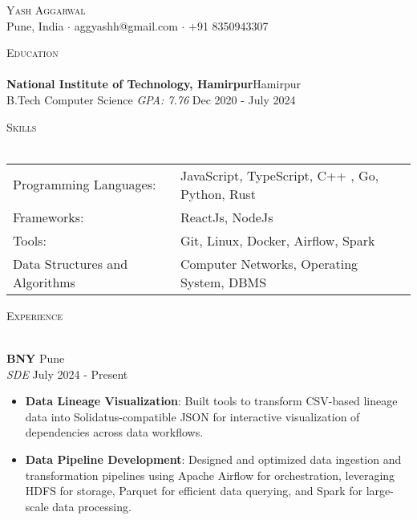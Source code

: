 \documentclass[a4paper]{article}
\newcommand{\lineunder} {
    \vspace*{-8pt} \\
    \hspace*{-18pt} \hrulefill \\
}
\newcommand{\header} [1] {
    {\hspace*{-18pt}\vspace*{6pt} \textsc{#1}}
    \vspace*{-6pt} \lineunder
}
\begin{document}
\vspace*{-40pt}



\vspace*{-10pt}
\begin{center}
	{\Huge \scshape {Yash Aggarwal}}\\
	Pune, India $\cdot$ aggyashh@gmail.com $\cdot$ +91 8350943307\\
\end{center}

\header{Education}
\textbf{National Institute of Technology, Hamirpur}\hfill Hamirpur\\
B.Tech Computer Science \textit{GPA: 7.76} \hfill Dec 2020 - July 2024\\
\vspace{2mm}

\header{Skills}
\begin{tabular}{ l l }
	Programming Languages:          & JavaScript, TypeScript, C++ , Go, Python, Rust        \\
	Frameworks:                     &  ReactJs, NodeJs          \\
	Tools:                          & Git, Linux, Docker, Airflow, Spark  \\
	Data Structures and Algorithms  & Computer Networks, Operating System, DBMS                                           \\
\end{tabular}
\vspace{2mm}

\header{Experience}
\vspace{1mm}

\textbf{BNY} \hfill Pune\\
\textit{SDE} \hfill July 2024 - Present\\
\vspace{-1mm}
\begin{itemize} \itemsep 1pt
\item \textbf{Data Lineage Visualization}: Built tools to transform CSV-based lineage data into Solidatus-compatible JSON for interactive visualization of dependencies across data workflows.
\item \textbf{Data Pipeline Development}: Designed and optimized data ingestion and transformation pipelines using Apache Airflow for orchestration, leveraging HDFS for storage, Parquet for efficient data querying, and Spark for large-scale data processing.
\end{itemize}
\end{document}
